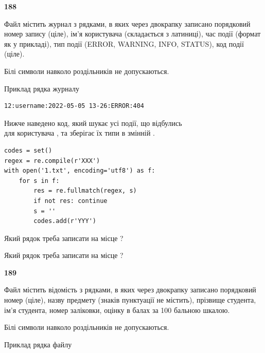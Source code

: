 \newpage

{\begin {center}\textbf{ 188}\end {center}}\par
Файл  містить журнал з рядками, в яких через двокрапку записано поряд\-ко\-вий номер запису (ціле), ім'я користувача (складається з латиниці), час події (фор\-мат як у прикладі), тип події (ERROR, WARNING, INFO, STATUS), код події (ціле).

Білі символи навколо роздільників не допускаються.

Приклад рядка журналу



\begin{verbatim}
12:username:2022-05-05 13-26:ERROR:404
\end{verbatim}


Нижче наведено код, який шукає усі події, що відбулись\\ для користувача , та зберігає їх типи в змінній .



\begin{verbatim}
codes = set()
regex = re.compile(r'XXX')
with open('1.txt', encoding='utf8') as f:
    for s in f:
        res = re.fullmatch(regex, s)
        if not res: continue
        s = ''
        codes.add(r'YYY')
\end{verbatim}





Який рядок треба записати на місце  ?\par
\vspace{5mm}


Який рядок треба записати на місце  ?\par


\newpage

{\begin {center}\textbf{ 189}\end {center}}\par
Файл  містить відомість з рядками, в яких через двокрапку записано поряд\-ковий номер (ціле), назву предмету (знаків пунктуації не містить), прізвище студента, ім'я студента, номер заліковки, оцінку в балах за 100 бальною шкалою.

Білі символи навколо роздільників не допускаються.

Приклад рядка файлу



